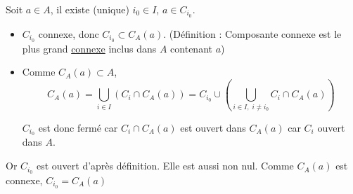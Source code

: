\begin{myproof}{}{}
Soit $a \in A$, il existe (unique) $i_0\in I$, $a \in C _{i_0}$. 
\begin{itemize}

    \item $C _{i_0}$ connexe, donc $C _{i_0} \subset C_A(a)$. (Définition : Composante connexe est le plus grand \underline{connexe} inclus dans $A$ contenant $a$)

    \item Comme $C _{A}(a) \subset A$,
      \[
        C_A(a) = \bigcup _{i \in I} \left(C_i \cap C_A(a)\right) = C _{i_0} \cup \left( \bigcup _{i \in I,\; i \ne i_0} C_i \cap C_A(a)\right)
      \]

      $C _{i_0}$ est donc fermé car $C_i \cap C_A(a)$ est ouvert dans $C_A(a)$ car $C_i$ ouvert dans $A$.


\end{itemize}

Or $C _{i_0}$ est ouvert d'après définition. Elle est aussi non nul. Comme $C_A(a)$ est connexe, $C _{i_0} = C_A(a)$
\end{myproof}






